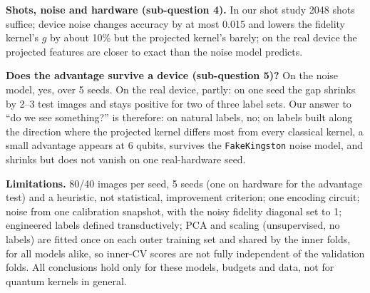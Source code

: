\documentclass[conference]{IEEEtran}
\begin{document}
\textbf{Shots, noise and hardware (sub-question 4).} In our shot study 2048 shots suffice; device noise changes accuracy by at most 0.015 and lowers the fidelity kernel's $g$ by about 10\% but the projected kernel's barely; on the real device the projected features are closer to exact than the noise model predicts.

\textbf{Does the advantage survive a device (sub-question 5)?} On the noise model, yes, over 5 seeds. On the real device, partly: on one seed the gap shrinks by 2--3 test images and stays positive for two of three label sets. Our answer to ``do we see something?'' is therefore: on natural labels, no; on labels built along the direction where the projected kernel differs most from every classical kernel, a small advantage appears at 6 qubits, survives the \texttt{FakeKingston} noise model, and shrinks but does not vanish on one real-hardware seed.

\textbf{Limitations.} 80/40 images per seed, 5 seeds (one on hardware for the advantage test) and a heuristic, not statistical, improvement criterion; one encoding circuit; noise from one calibration snapshot, with the noisy fidelity diagonal set to 1; engineered labels defined transductively; PCA and scaling (unsupervised, no labels) are fitted once on each outer training set and shared by the inner folds, for all models alike, so inner-CV scores are not fully independent of the validation folds. All conclusions hold only for these models, budgets and data, not for quantum kernels in general.
\end{document}
